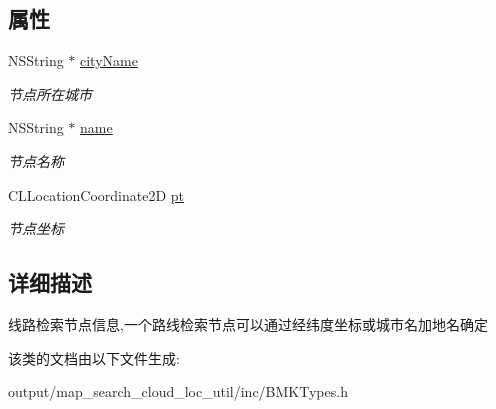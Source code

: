 \subsection*{属性}
\begin{DoxyCompactItemize}
\item 
\hypertarget{interface_b_m_k_plan_node_ae6181a2e46740e8422a0b0820eedd0bb}{N\+S\+String $\ast$ \hyperlink{interface_b_m_k_plan_node_ae6181a2e46740e8422a0b0820eedd0bb}{city\+Name}}\label{interface_b_m_k_plan_node_ae6181a2e46740e8422a0b0820eedd0bb}

\begin{DoxyCompactList}\small\item\em 节点所在城市 \end{DoxyCompactList}\item 
\hypertarget{interface_b_m_k_plan_node_afe487565841e6361610e53d77af75f65}{N\+S\+String $\ast$ \hyperlink{interface_b_m_k_plan_node_afe487565841e6361610e53d77af75f65}{name}}\label{interface_b_m_k_plan_node_afe487565841e6361610e53d77af75f65}

\begin{DoxyCompactList}\small\item\em 节点名称 \end{DoxyCompactList}\item 
\hypertarget{interface_b_m_k_plan_node_a1fa1ff65e104926cc145168df5261136}{C\+L\+Location\+Coordinate2\+D \hyperlink{interface_b_m_k_plan_node_a1fa1ff65e104926cc145168df5261136}{pt}}\label{interface_b_m_k_plan_node_a1fa1ff65e104926cc145168df5261136}

\begin{DoxyCompactList}\small\item\em 节点坐标 \end{DoxyCompactList}\end{DoxyCompactItemize}


\subsection{详细描述}
线路检索节点信息,一个路线检索节点可以通过经纬度坐标或城市名加地名确定 

该类的文档由以下文件生成\+:\begin{DoxyCompactItemize}
\item 
output/map\+\_\+search\+\_\+cloud\+\_\+loc\+\_\+util/inc/B\+M\+K\+Types.\+h\end{DoxyCompactItemize}
